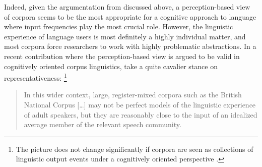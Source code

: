 Indeed, given the argumentation from \citet{Gries2017b} discussed above, a perception-based view of corpora seems to be the most appropriate for a cognitive approach to language where input frequencies play the most crucial role.
However, the linguistic experience of language users is most definitely a highly individual matter, and most corpora force researchers to work with highly problematic abstractions.
In a recent contribution where the percep\-tion-based view is argued to be valid in cognitively oriented corpus linguistics, \citet[104]{StefanowitschFlach2016} take a quite cavalier stance on representativeness:%
\footnote{The picture does not change significantly if corpora are seen as collections of linguistic output events under a cognitively oriented perspective \citep{TummersEa2005}.}

\begin{quote}
In this wider context, large, register-mixed corpora such as the British National Corpus [\ldots] may not be perfect models of the linguistic experience of adult speakers, but they are reasonably close to the input of an idealized average member of the relevant speech community.
\end{quote}

